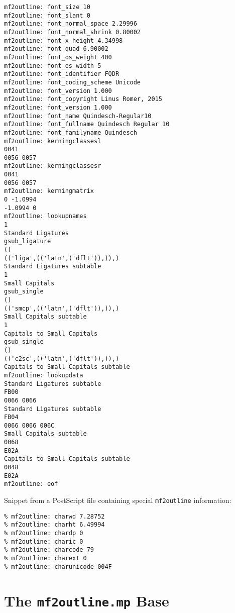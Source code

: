 \documentclass{scrartcl}
\begin{document}
\begin{lstlisting}
mf2outline: font_size 10
mf2outline: font_slant 0
mf2outline: font_normal_space 2.29996
mf2outline: font_normal_shrink 0.80002
mf2outline: font_x_height 4.34998
mf2outline: font_quad 6.90002
mf2outline: font_os_weight 400
mf2outline: font_os_width 5
mf2outline: font_identifier FQDR
mf2outline: font_coding_scheme Unicode
mf2outline: font_version 1.000
mf2outline: font_copyright Linus Romer, 2015
mf2outline: font_version 1.000
mf2outline: font_name Quindesch-Regular10
mf2outline: font_fullname Quindesch Regular 10
mf2outline: font_familyname Quindesch
mf2outline: kerningclassesl 
0041 
0056 0057 
mf2outline: kerningclassesr 
0041 
0056 0057 
mf2outline: kerningmatrix 
0 -1.0994 
-1.0994 0 
mf2outline: lookupnames 
1
Standard Ligatures
gsub_ligature
()
(('liga',(('latn',('dflt')),)),)
Standard Ligatures subtable
1
Small Capitals
gsub_single
()
(('smcp',(('latn',('dflt')),)),)
Small Capitals subtable
1
Capitals to Small Capitals
gsub_single
()
(('c2sc',(('latn',('dflt')),)),)
Capitals to Small Capitals subtable
mf2outline: lookupdata 
Standard Ligatures subtable
FB00
0066 0066 
Standard Ligatures subtable
FB04
0066 0066 006C 
Small Capitals subtable
0068
E02A 
Capitals to Small Capitals subtable
0048
E02A 
mf2outline: eof
\end{lstlisting}
%
Snippet from a PostScript file containing special \texttt{mf2outline} information:\lstset{language=PostScript,columns=fullflexible}
\begin{lstlisting}
% mf2outline: charwd 7.28752
% mf2outline: charht 6.49994
% mf2outline: chardp 0
% mf2outline: charic 0
% mf2outline: charcode 79
% mf2outline: charext 0
% mf2outline: charunicode 004F
\end{lstlisting}
%
\section{The \texttt{mf2outline.mp} Base}
%
\end{document}
